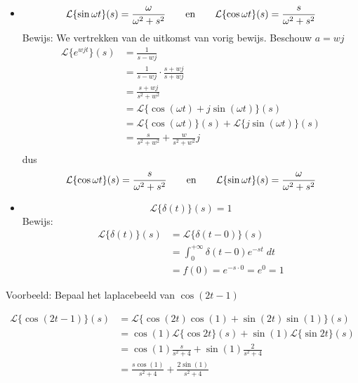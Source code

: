 \documentclass[12pt]{report}
\newcommand{\example}[2]{
      \hrulefill
      
      Voorbeeld: #1
      
      #2
      
      \hrulefill
}
\begin{document}
\begin{itemize}
 \item $$\mathcal{L}\{\sin \omega t\}(s) = \frac{\omega}{\omega^2 + s^2} \qquad  \hbox{en} \qquad  \mathcal{L}\{\cos \omega t\}(s) = \frac{s}{\omega^2 + s^2}$$
 Bewijs: We vertrekken van de uitkomst van vorig bewijs. Beschouw $a = wj$
 \begin{equation*}
  \begin{split}
   \mathcal{L}\{e^{wjt}\}(s) & = \frac{1}{s - wj} \\
                             & = \frac{1}{s - wj} \cdot \frac{s + wj}{s + wj} \\
			     & = \frac{s + wj}{s^2 + w^2}\\
			     & = \mathcal{L}\{\cos (\omega t) + j\sin(\omega t)\}(s) \\
			     & = \mathcal{L}\{\cos (\omega t)\}(s) + \mathcal{L}\{j\sin(\omega t) \}(s) \\
			     & = \frac{s}{s^2 + w^2} + \frac{w}{s^2 + w^2}j \\ 
  \end{split}
 \end{equation*}
  dus $$\mathcal{L}\{\cos \omega t\}(s) = \frac{s}{\omega^2 + s^2} \qquad  \hbox{en} \qquad  \mathcal{L}\{\sin \omega t\}(s) = \frac{\omega}{\omega^2 + s^2}$$
  
  \item 
  $$\mathcal{L}\{\delta(t)\}(s) = 1$$
  Bewijs:
  \begin{equation*}
   \begin{split}
    \mathcal{L}\{\delta(t)\}(s) & = \mathcal{L}\{\delta(t - 0)\}(s) \\
				& = \int_{0}^{+\infty}\delta(t - 0)e^{-st}\;dt \\
				& = f(0) = e^{-s\cdot0} = e^{0} = 1
   \end{split}
  \end{equation*}
\end{itemize}
\example{Bepaal het laplacebeeld van $\cos{(2t - 1)}$}{
\begin{equation*}
 \begin{split}
  \mathcal{L}\{\cos(2t - 1)\}(s) & = \mathcal{L}\{\cos(2t)\cos( 1 )+ \sin(2t)\sin (1)\}(s) \\
                 & = \cos (1) \mathcal{L}\{\cos 2t\}(s) + \sin (1 )\mathcal{L}\{\sin 2t\}(s)\\
                 & = \cos (1) \frac{s}{s^2 + 4} + \sin (1) \frac{2}{s^2 + 4} \\
                 & = \frac{s\cos(1)}{s^2 + 4} + \frac{2\sin(1)}{s^2 + 4}
 \end{split}
\end{equation*}
}
\end{document}
